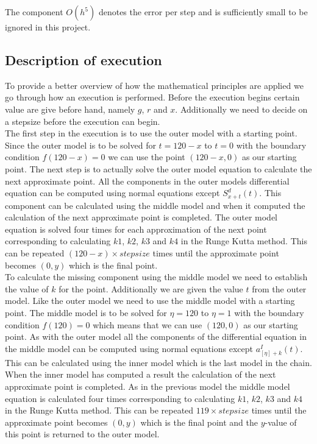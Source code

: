 The component $O(h^5)$ denotes the error per step and is sufficiently small to be ignored in this project.

\subsection{Description of execution}
	To provide a better overview of how the mathematical principles are applied we go through how an execution is performed. Before the execution begins certain value are give before hand, namely $g$, $r$ and $x$. Additionally we need to decide on a stepsize before the execution can begin. \\
	
	The first step in the execution is to use the outer model with a starting point. Since the outer model is to be solved for $t=120-x$ to $t=0$ with the boundary condition $f(120-x)=0$ we can use the point $(120-x, 0)$ as our starting point. The next step is to actually solve the outer model equation to calculate the next approximate point. All the components in the outer models differential equation can be computed using normal equations except $S_{x+t}^d (t)$. This component can be calculated using the middle model and when it computed the calculation of the next approximate point is completed. The outer model equation is solved four times for each approximation of the next point corresponding to calculating $k1$, $k2$, $k3$ and $k4$ in the Runge Kutta method. This can be repeated $(120-x) \times stepsize$ times until the approximate point becomes $(0,y)$ which is the final point. \\
	
	To calculate the missing component using the middle model we need to establish the value of $k$ for the point. Additionally we are given the value $t$ from the outer model. Like the outer model we need to use the middle model with a starting point. The middle model is to be solved for $\eta = 120$ to $\eta = 1$ with the boundary condition $f(120) = 0$ which means that we can use $(120,0)$ as our starting point. As with the outer model all the components of the differential equation in the middle model can be computed using normal equations except $a_{[\eta]+k}^I(t)$. This can be calculated using the inner model which is the last model in the chain. When the inner model has computed a result the calculation of the next approximate point is completed. As in the previous model the middle model equation is calculated four times corresponding to calculating $k1$, $k2$, $k3$ and $k4$ in the Runge Kutta method. This can be repeated $119 \times stepsize$ times until the approximate point becomes $(0,y)$ which is the final point and the $y$-value of this point is returned to the outer model. \\
	
